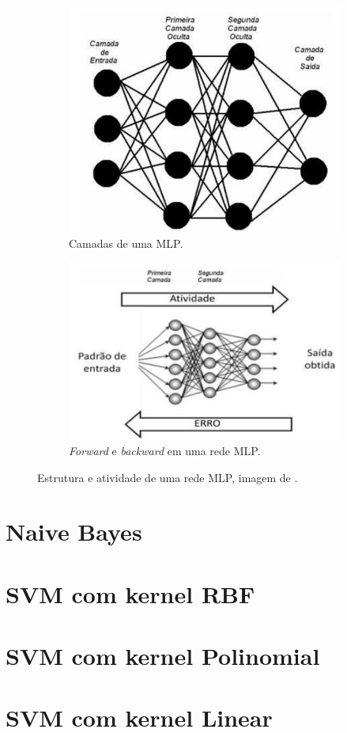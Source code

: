 \begin{figure}[h]
    \centering
    \begin{subfigure}{0.4\textwidth}
      \centering
      \includegraphics[width=\linewidth]{figuras/MLP/rede_MLP.png}
      \caption{Camadas de uma MLP.}
      \label{fig:subfigura1}
    \end{subfigure}
    \hspace{5mm}
    \begin{subfigure}{0.45\textwidth}
      \centering
      \includegraphics[width=\linewidth]{figuras/MLP/atividade_MLP.png}
      \caption{\textit{Forward} e \textit{backward} em uma rede MLP.}
      \label{fig:subfigura2}
    \end{subfigure}
    \caption{Estrutura e atividade de uma rede MLP, imagem de \cite{su12114776}.}
    \label{fig:subfiguras}
  \end{figure}

\section{Naive Bayes}

\section{SVM com kernel RBF}

\section{SVM com kernel Polinomial}

\section{SVM com kernel Linear}
